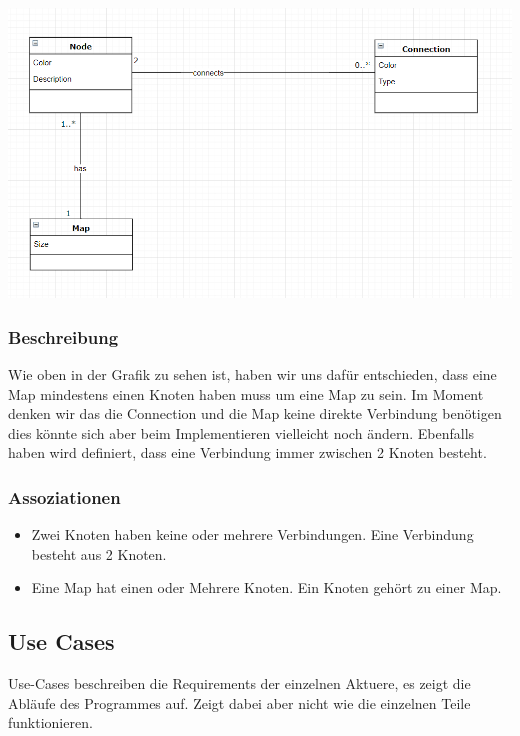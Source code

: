 \documentclass[a4paper,parskip]{scrartcl}
\begin{document}
\includegraphics[width=\linewidth]{DomainModel.PNG}

\subsubsection{Beschreibung}
Wie oben in der Grafik zu sehen ist, haben wir uns dafür entschieden, dass eine Map mindestens einen Knoten haben muss um eine Map zu sein. Im Moment denken wir das die Connection und die Map keine direkte Verbindung benötigen dies könnte sich aber beim Implementieren vielleicht noch ändern. Ebenfalls haben wird definiert, dass eine Verbindung immer zwischen 2 Knoten besteht.

\subsubsection{Assoziationen}
\begin{itemize}
\item Zwei Knoten haben keine oder mehrere Verbindungen. Eine Verbindung besteht aus 2 Knoten.
\item Eine Map hat einen oder Mehrere Knoten. Ein Knoten gehört zu einer Map.
\end{itemize}

\subsection{Use Cases}
Use-Cases beschreiben die Requirements der einzelnen Aktuere, es zeigt die Abläufe des Programmes auf. Zeigt dabei aber nicht wie die einzelnen Teile funktionieren.
\end{document}
